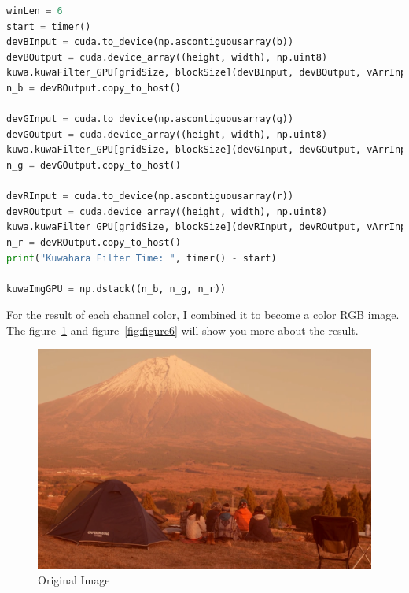 \documentclass{article}
\begin{document}
\begin{lstlisting}[language=Python]
winLen = 6
start = timer()
devBInput = cuda.to_device(np.ascontiguousarray(b))
devBOutput = cuda.device_array((height, width), np.uint8)
kuwa.kuwaFilter_GPU[gridSize, blockSize](devBInput, devBOutput, vArrInput, height, width, winLen)
n_b = devBOutput.copy_to_host()

devGInput = cuda.to_device(np.ascontiguousarray(g))
devGOutput = cuda.device_array((height, width), np.uint8)
kuwa.kuwaFilter_GPU[gridSize, blockSize](devGInput, devGOutput, vArrInput, height, width, winLen)
n_g = devGOutput.copy_to_host()

devRInput = cuda.to_device(np.ascontiguousarray(r))
devROutput = cuda.device_array((height, width), np.uint8)
kuwa.kuwaFilter_GPU[gridSize, blockSize](devRInput, devROutput, vArrInput, height, width, winLen)
n_r = devROutput.copy_to_host()
print("Kuwahara Filter Time: ", timer() - start)

kuwaImgGPU = np.dstack((n_b, n_g, n_r))
\end{lstlisting}

For the result of each channel color, I combined it to become a color RGB image. The figure~\ref{fig:figure5} and figure~\ref{fig:figure6} will show you more about the result.

\begin{figure}
    \centering
    \includegraphics[scale=0.5]{images/yuru.jpg}
    \caption{Original Image}
    \label{fig:figure5}
\end{figure}

\pagebreak
\end{document}
